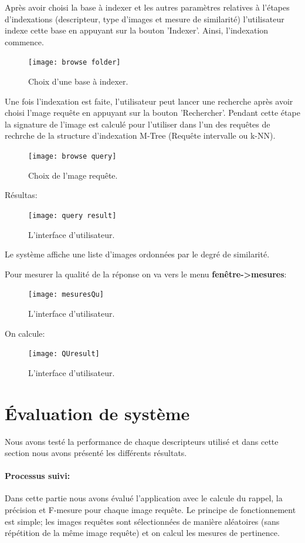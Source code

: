Après avoir choisi la base à indexer et les autres paramètres relatives à l'étapes d'indexations (descripteur, type d'images et mesure de similarité) l’utilisateur indexe cette base en appuyant sur la bouton 'Indexer'. Ainsi, l'indexation commence. \\

\begin{figure}[H]
	\centering
	\texttt{[image: browse folder]} 
	\caption{Choix d'une base à indexer.}
\end{figure}

Une fois l'indexation est faite, l’utilisateur peut lancer une recherche après avoir choisi l'mage requête en appuyant sur la bouton 'Rechercher'. Pendant cette étape la signature de l’image est calculé pour l'utiliser dans l'un des requêtes de rechrche de la structure d'indexation M-Tree (Requête intervalle ou k-NN).\\

\begin{figure}[H]
	\centering
	\texttt{[image: browse query]} 
	\caption{Choix de l'mage requête.}
\end{figure}
Résultas:
\begin{figure}[H]
	\centering
	\texttt{[image: query result]} 
	\caption{L'interface d’utilisateur.}
\end{figure}

Le système affiche une liste d'images ordonnées par le degré de similarité.

Pour mesurer la qualité de la réponse on va vers le menu \textbf{fenêtre->mesures}:
\begin{figure}[H]
	\centering
	\texttt{[image: mesuresQu]} 
	\caption{L'interface d’utilisateur.}
\end{figure}
On calcule:
\begin{figure}[H]
	\centering
	\texttt{[image: QUresult]} 
	\caption{L'interface d’utilisateur.}
\end{figure}

\section{Évaluation de système}
Nous avons testé la performance de chaque descripteurs utilisé et dans cette section nous avons présenté les différents résultats.

\paragraph{Processus suivi:}
Dans cette partie nous avons évalué l’application avec le calcule du rappel, la précision et F-mesure pour chaque image requête. Le principe de fonctionnement est simple; les images requêtes sont sélectionnées de manière aléatoires (sans répétition de la même image requête) et on calcul les mesures de pertinence. 
